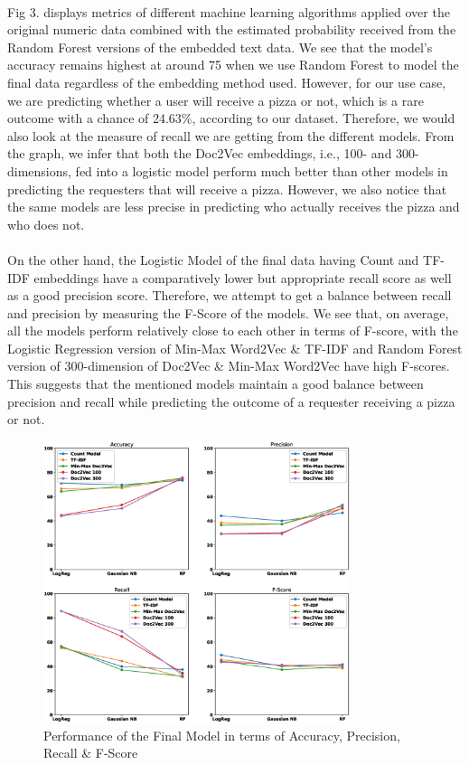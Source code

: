 \documentclass[runningheads]{llncs}
\begin{document}
\\Fig 3. displays metrics of different machine learning algorithms applied over the original numeric data combined with the estimated probability received from the Random Forest versions of the embedded text data. We see that the model’s accuracy remains highest at around 75 when we use Random Forest to model the final data regardless of the embedding method used. However, for our use case, we are predicting whether a user will receive a pizza or not, which is a rare outcome with a chance of 24.63\%, according to our dataset. Therefore, we would also look at the measure of recall we are getting from the different models. From the graph, we infer that both the Doc2Vec embeddings, i.e., 100- and 300- dimensions, fed into a logistic model perform much better than other models in predicting the requesters that will receive a pizza. However, we also notice that the same models are less precise in predicting who actually receives the pizza and who does not.\\
\\On the other hand, the Logistic Model of the final data having Count and TF-IDF embeddings have a comparatively lower but appropriate recall score as well as a good precision score. Therefore, we attempt to get a balance between recall and precision by measuring the F-Score of the models. We see that, on average, all the models perform relatively close to each other in terms of F-score, with the Logistic Regression version of Min-Max Word2Vec \& TF-IDF and Random Forest version of 300-dimension of Doc2Vec \& Min-Max Word2Vec have high F-scores. This suggests that the mentioned models maintain a good balance between precision and recall while predicting the outcome of a requester receiving a pizza or not.\\
\begin{figure}
    \centering
    \includegraphics[width=0.8\textwidth]{Final_Model_Performance.eps}
    \caption{Performance of the Final Model in terms of Accuracy, Precision, Recall \& F-Score} \label{fig3}
\end{figure}
\end{document}
